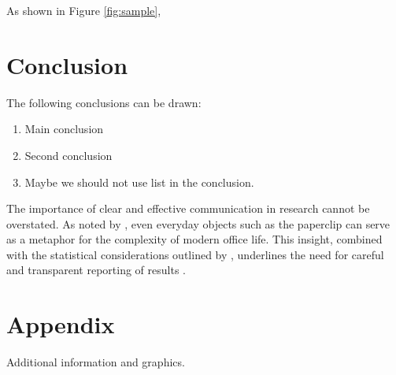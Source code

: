 \documentclass{article}
\begin{document}
As shown in Figure \ref{fig:sample}, \lipsum[7]



\section{Conclusion}


\lipsum[10]	

The following conclusions can be drawn:

\begin{enumerate}
	\item Main conclusion
	\item Second conclusion
	\item Maybe we should not use list in the conclusion. 
\end{enumerate}

The importance of clear and effective communication in research cannot be
overstated. As noted by \textcite{Graham1995}, even everyday objects such
as the paperclip can serve as a metaphor for the complexity of modern
office life. This insight, combined with the statistical considerations
outlined by \textcite{Huff1954}, underlines the need for careful and
transparent reporting of results \autocite{Graham1995, Huff1954}.


\newpage

\printbibliography

\newpage 


\section{Appendix}

Additional information and graphics.
\end{document}
